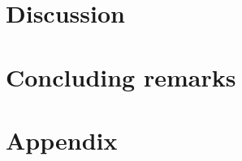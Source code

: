 \documentclass[twocolumn,english,notitlepage]{article}
\begin{document}
\section{Discussion}


\section{Concluding remarks} 

\clearpage

\newpage

\renewcommand{\theequation}{\thesection.\arabic{equation}}
\newpage

\section{Appendix}
\begin{appendices}
     
\end{appendices}
\end{document}
